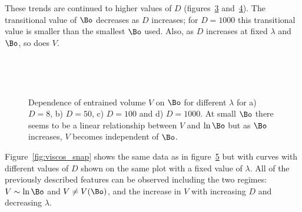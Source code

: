 {These trends are continued to higher values of $D$ (figures~\ref{fig:mdr=100} and~\ref{fig:mdr=1000}). The transitional value of $\Bo$ decreases as $D$ increases; for $D = 1000$ this transitional value is smaller than the smallest $\Bo$ used. Also, as $D$ increases at fixed $\lambda$ and $\Bo$, so does $V$.


    \begin{figure}
      \centering
      \begin{subfigure}[b]{0.45\textwidth}
        \resizebox{\textwidth}{!}{\Large }
        \caption{}
        \label{fig:mdr=8}
      \end{subfigure}
      ~
      \begin{subfigure}[b]{0.45\textwidth}
        \resizebox{\textwidth}{!}{\Large }
        \caption{}
        \label{fig:mdr=50}
      \end{subfigure}
      
      \begin{subfigure}[b]{0.45\textwidth}
        \resizebox{\textwidth}{!}{\Large }
        \caption{}
        \label{fig:mdr=100}
      \end{subfigure}
      ~
      \begin{subfigure}[b]{0.45\textwidth}
        \resizebox{\textwidth}{!}{\Large }
        \caption{}
        \label{fig:mdr=1000}
      \end{subfigure}
      \caption{Dependence of entrained volume $V$ on $\Bo$ for different $\lambda$ for a) $D = 8$, b) $D = 50$, c) $D = 100$ and d) $D = 1000$. At small $\Bo$ there seems to be a linear relationship between $V$ and $\ln\Bo$ but as $\Bo$ increases, $V$ becomes independent of $\Bo$. }\label{fig:mdr_snap}
    \end{figure}

Figure~\ref{fig:viscos_snap} shows the same data as in figure~\ref{fig:mdr_snap} but with curves with different values of $D$ shown on the same plot with a fixed value of $\lambda$. All of the previously described features can be observed including the two regimes: $V \sim \ln\Bo$ and $V \neq V(\Bo)$, and the increase in $V$ with increasing $D$ and decreasing $\lambda$.

    \begin{figure}
      \centering
      \begin{subfigure}[b]{0.45\textwidth}
        \resizebox{\textwidth}{!}{\Large }
        \caption{}
        \label{fig:viscos_rat=0.001}
      \end{subfigure}
      ~
      \begin{subfigure}[b]{0.45\textwidth}
        \resizebox{\textwidth}{!}{\Large }
        \caption{}
        \label{fig:viscos_rat=0.005}
      \end{subfigure}
      

\end{figure}}
